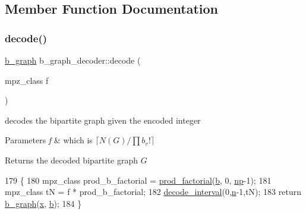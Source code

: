 \subsection{Member Function Documentation}
\mbox{\label{classb__graph__decoder_a81cffad95fa5a051fa4421b164f236a9}} 
\subsubsection{\texorpdfstring{decode()}{decode()}}
{\footnotesize\ttfamily \hyperlink{classb__graph}{b\+\_\+graph} b\+\_\+graph\+\_\+decoder\+::decode (\begin{DoxyParamCaption}\item[{mpz\+\_\+class}]{f }\end{DoxyParamCaption})}



decodes the bipartite graph given the encoded integer 


\begin{DoxyParams}{Parameters}
{\em f} & which is $\lceil N(G) / \prod b_v! \rceil$ \\
\hline
\end{DoxyParams}
\begin{DoxyReturn}{Returns}
the decoded bipartite graph $G$ 
\end{DoxyReturn}

\begin{DoxyCode}
179 \{
180   mpz\_class prod\_b\_factorial = \hyperlink{compression__helper_8cpp_a86d8a20e022dc06b23df3b08ac10b7d1}{prod\_factorial}(\hyperlink{classb__graph__decoder_a12d1a4a91f342111d2116196cb826317}{b}, 0, \hyperlink{classb__graph__decoder_a7eca48cf8793e722d1b29dbdc9fd2dca}{np}-1);
181   mpz\_class tN = f * prod\_b\_factorial;
182   \hyperlink{classb__graph__decoder_ae8b20698e015819cbdb8da7997888fd8}{decode\_interval}(0,\hyperlink{classb__graph__decoder_a2caddd63df6808c95e2ee738f7c77870}{n}-1,tN);
183   \textcolor{keywordflow}{return} \hyperlink{classb__graph}{b\_graph}(\hyperlink{classb__graph__decoder_a6bba2e67984f9733fc60c40dd4956587}{x}, \hyperlink{classb__graph__decoder_a12d1a4a91f342111d2116196cb826317}{b});
184 \}
\end{DoxyCode}
\mbox{\label{classb__graph__decoder_ae8b20698e015819cbdb8da7997888fd8}} 
